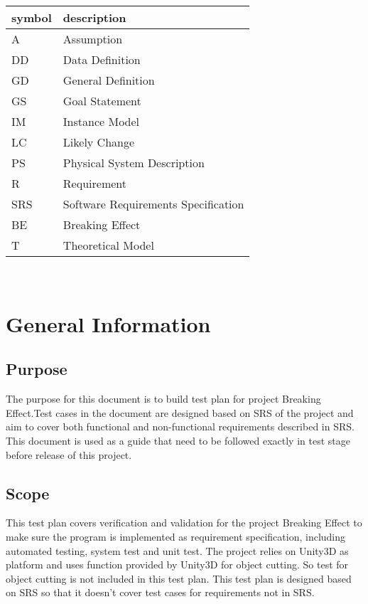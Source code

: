 \documentclass[12pt, titlepage]{article}
\begin{document}
	\renewcommand{\arraystretch}{1.2}
	\begin{tabular}{l l} 
		\toprule		
		\textbf{symbol} & \textbf{description}\\
		\midrule 
		A & Assumption\\
		DD & Data Definition\\
		GD & General Definition\\
		GS & Goal Statement\\
		IM & Instance Model\\
		LC & Likely Change\\
		PS & Physical System Description\\
		R & Requirement\\
		SRS & Software Requirements Specification\\
		BE & Breaking Effect\\
		T & Theoretical Model\\
		\bottomrule
	\end{tabular}\\
	
	
\newpage

\tableofcontents

\listoftables

\listoffigures

\newpage


\section{General Information}

\subsection{Purpose}

The purpose for this document is to build test plan for project Breaking Effect.Test cases in the document are designed based on SRS of the project and aim to cover both functional and non-functional requirements described in SRS.\\ 

This document is used as a guide that need to be followed exactly in test stage before release of this project. \\

\subsection{Scope}
This test plan covers verification and validation for the project Breaking Effect to make sure the program is implemented as requirement specification, including automated testing, system test and unit test. The project relies on Unity3D as platform and uses function provided by Unity3D for object cutting. So test for object cutting is not included in this test plan. This test plan is designed based on SRS so that it doesn't cover test cases for requirements not in SRS. 
\end{document}

